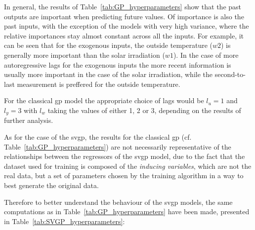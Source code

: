 In general, the results of Table~\ref{tab:GP_hyperparameters} show that the past
outputs are important when predicting future values. Of importance is also the
past inputs, with the exception of the models with very high variance, where the
relative importances stay almost constant across all the inputs. For example, it
can be seen that for the exogenous inputs, the outside temperature ($w2$) is
generally more important than the solar irradiation ($w1$). In the case of more
autoregressive lags for the exogenous inputs the more recent information is
usually more important in the case of the solar irradiation, while the
second-to-last measurement is preffered for the outside temperature.

For the classical \acrshort{gp} model the appropriate choice of lags would be
$l_u = 1$ and $l_y = 3$ with $l_w$ taking the values of either 1, 2 or 3,
depending on the results of further analysis.


As for the case of the \acrlong{svgp}, the results for the classical
\acrshort{gp} (cf. Table~\ref{tab:GP_hyperparameters}) are not necessarily
representative of the relationships between the regressors of the
\acrshort{svgp} model, due to the fact that the dataset used for training is
composed of the \textit{inducing variables}, which are not the real data, but a
set of parameters chosen by the training algorithm in a way to best generate the
original data.

Therefore to better understand the behaviour of the \acrshort{svgp} models, the
same computations as in Table~\ref{tab:GP_hyperparameters} have been made,
presented in Table~\ref{tab:SVGP_hyperparameters}:

